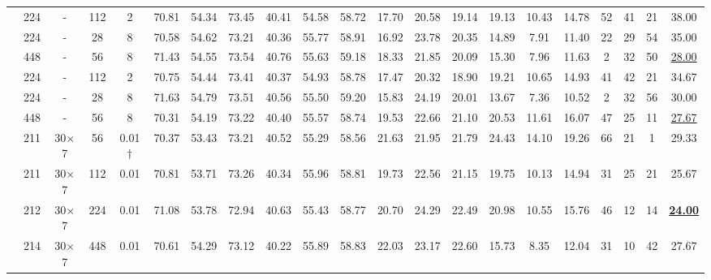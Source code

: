 \begin{table}[!ht]
{\begin{tabular}{l|cccc|cccccc|ccc|ccc|cccc}
& 224 & - & 112 & 2 &70.81	&54.34	&73.45&	40.41&	54.58	&58.72&	17.70	&20.58	&19.14	&19.13	&10.43	&14.78  &52&	41	&21	&38.00\\
& 224 & - & 28 & 8  & 70.58	&54.62	&73.21	&40.36	&55.77	&58.91	&16.92	&23.78	&20.35	&14.89	&7.91	&11.40 &22	&29&	54&	35.00\\
& 448 & - & 56 & 8 & 71.43	&54.55	&73.54	&40.76&	55.63	&59.18&	18.33	&21.85	&20.09	&15.30&	7.96	&11.63& 2&	32	&50&	\underline{28.00} \\
\midrule
{} 
& 224 & - & 112 & 2 &70.75	&54.44&	73.41&	40.37&	54.93&	58.78&	17.47&	20.32&	18.90&	19.21&	10.65&	14.93& 41	&42	&21&34.67\\
& 224 & - & 28 & 8 & 71.63	&54.79	&73.51	&40.56&	55.50&	59.20&	15.83&	24.19	&20.01&	13.67&	7.36&	10.52& 2&	32	&56  &30.00\\
& 448 & - & 56 & 8  &70.31	&54.19	&73.22	&40.40	&55.57	&58.74	&19.53	&22.66&	21.10	&20.53	&11.61	&16.07 &47&	25	&11&	\underline{27.67}  \\
\midrule
{} 
& 211 & 30$\times$7 & 56 & 0.01$\dagger$ & 70.37	&53.43&	73.21	&40.52&	55.29&	58.56	&21.63	&21.95	&21.79	&24.43	&14.10	&19.26 &66	&21&	1	&29.33\\
& 211  & 30$\times$7 & 112 & 0.01 & 70.81&	53.71&	73.26	&40.34&	55.96&	58.81&	19.73&	22.56&	21.15&	19.75&	10.13&	14.94& 31	&25	&21	&25.67 \\
& 212  & 30$\times$7 & 224 & 0.01 & 71.08	& 53.78	& 72.94	& 40.63	& 55.43	& 58.77 &	20.70	& 24.29	& 22.49	& 20.98	& 10.55	& 15.76 & 46	& 12	& 14	& \textbf{\underline{24.00}} \\
& 214 & 30$\times$7 & 448 & 0.01 & 70.61&	54.29&	73.12&	40.22	&55.89	&58.83&	22.03	&23.17	&22.60	&15.73	&8.35	&12.04 &31	&10	&42	&27.67\\
\bottomrule
\end{tabular}
}
\end{table}